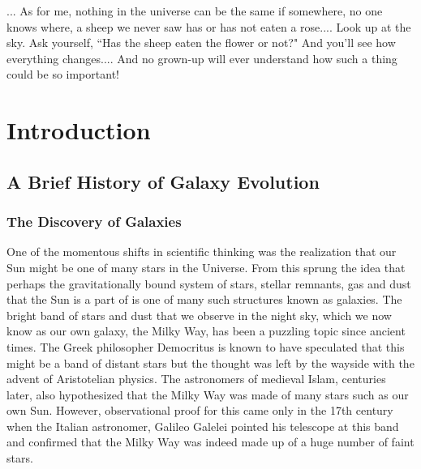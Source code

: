 \begin{savequote}[75mm]

... As for me, nothing in the universe can be the same if somewhere, no one knows where, a sheep we never saw has or has not eaten a rose....
Look up at the sky. Ask yourself, ``Has the sheep eaten the flower or not?" And you'll see how everything changes....
And no grown-up will ever understand how such a thing could be so important!
\end{savequote}


\chapter{Introduction}
\label{introduction}

\section{A Brief History of Galaxy Evolution}

\subsection{The Discovery of Galaxies}
One of the momentous shifts in scientific thinking was the realization that our Sun might be one of many stars in the Universe. From this sprung the idea that perhaps the gravitationally bound system of stars, stellar remnants, gas and dust that the Sun is a part of is one of many such structures known as galaxies. The bright band of stars and dust that we observe in the night sky, which we now know as our own galaxy, the Milky Way, has been a puzzling topic since ancient times. The Greek philosopher Democritus is known to have speculated that this might be a band of distant stars \citep{lynn_letter} but the thought was left by the wayside with the advent of Aristotelian physics. The astronomers of medieval Islam, centuries later, also hypothesized that the Milky Way was made of many stars such as our own Sun. However, observational proof for this came only in the 17th century when the Italian astronomer, Galileo Galelei pointed his telescope at this band and confirmed that the Milky Way was indeed made up of a huge number of faint stars.\\

